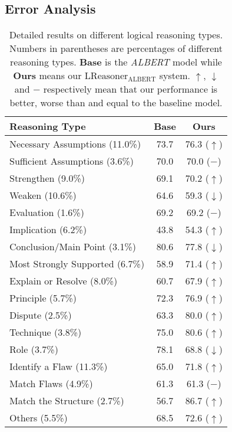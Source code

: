 \documentclass[11pt,a4paper]{article}
\begin{document}
\subsection{Error Analysis}
\begin{table}[!h]
    \setlength\tabcolsep{3pt}
\newcommand{\tabincell}[2]{\begin{tabular}{@{}#1@{}}#2\end{tabular}}
	\centering
	\begin{tabular}{lcc}
	\toprule
	\bf Reasoning Type & \bf Base & \bf Ours \\
	\midrule  				
	Necessary Assumptions (11.0\%)& 73.7 & 76.3 ($\uparrow$)\\
	Sufficient Assumptions (3.6\%)& 70.0 & 70.0 ($-$)\\
	Strengthen (9.0\%)& 69.1 & 70.2 ($\uparrow$)\\
	Weaken (10.6\%)& 64.6 & 59.3 ($\downarrow$)\\
	Evaluation (1.6\%)& 69.2 & 69.2 ($-$)\\
	Implication (6.2\%)& 43.8 & 54.3 ($\uparrow$)\\
	Conclusion/Main Point (3.1\%)& 80.6 & 77.8 ($\downarrow$)\\
	Most Strongly Supported (6.7\%)& 58.9 & 71.4 ($\uparrow$)\\
	Explain or Resolve (8.0\%)& 60.7 & 67.9 ($\uparrow$) \\
	Principle (5.7\%) & 72.3 & 76.9 ($\uparrow$)\\ 
	Dispute (2.5\%) & 63.3 & 80.0 ($\uparrow$)\\
	Technique (3.8\%) & 75.0 & 80.6 ($\uparrow$)\\
    Role (3.7\%) & 78.1 & 68.8 ($\downarrow$)\\
    Identify a Flaw (11.3\%) & 65.0 & 71.8 ($\uparrow$)\\
    Match Flaws (4.9\%) & 61.3 & 61.3 ($-$)\\
    Match the Structure (2.7\%) & 56.7 & 86.7 ($\uparrow$)\\
    Others (5.5\%) & 68.5 & 72.6 ($\uparrow$)\\
	\bottomrule
 	\end{tabular}
	\caption{Detailed results on different logical reasoning types. Numbers in parentheses are percentages of different reasoning types. \textbf{Base} is the \emph{ALBERT} model while \textbf{Ours} means our \emph{$\text{LReasoner}_{\text{ALBERT}}$} system.
	$\uparrow$, $\downarrow$ and $-$ respectively mean that our performance is better, worse than and equal to the baseline model.}
	\label{table_type}
\end{table}
\end{document}
